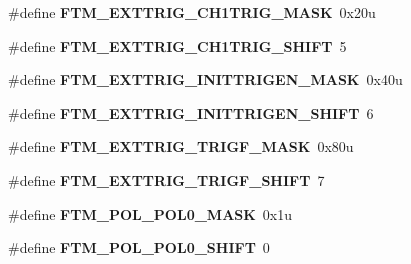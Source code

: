 \begin{DoxyCompactItemize}
\item 
\#define {\bfseries F\+T\+M\+\_\+\+E\+X\+T\+T\+R\+I\+G\+\_\+\+C\+H1\+T\+R\+I\+G\+\_\+\+M\+A\+SK}~0x20u\hypertarget{group__FTM__Register__Masks_ga5a26c6fcf0477c95760e13f68913b5de}{}\label{group__FTM__Register__Masks_ga5a26c6fcf0477c95760e13f68913b5de}

\item 
\#define {\bfseries F\+T\+M\+\_\+\+E\+X\+T\+T\+R\+I\+G\+\_\+\+C\+H1\+T\+R\+I\+G\+\_\+\+S\+H\+I\+FT}~5\hypertarget{group__FTM__Register__Masks_gab622ad237cfc1d00f20b317d23bff1ca}{}\label{group__FTM__Register__Masks_gab622ad237cfc1d00f20b317d23bff1ca}

\item 
\#define {\bfseries F\+T\+M\+\_\+\+E\+X\+T\+T\+R\+I\+G\+\_\+\+I\+N\+I\+T\+T\+R\+I\+G\+E\+N\+\_\+\+M\+A\+SK}~0x40u\hypertarget{group__FTM__Register__Masks_ga71d3ac60b3056f50c6d22c8e3b2701bb}{}\label{group__FTM__Register__Masks_ga71d3ac60b3056f50c6d22c8e3b2701bb}

\item 
\#define {\bfseries F\+T\+M\+\_\+\+E\+X\+T\+T\+R\+I\+G\+\_\+\+I\+N\+I\+T\+T\+R\+I\+G\+E\+N\+\_\+\+S\+H\+I\+FT}~6\hypertarget{group__FTM__Register__Masks_ga910785e872df234670a45cf1b00ad7c3}{}\label{group__FTM__Register__Masks_ga910785e872df234670a45cf1b00ad7c3}

\item 
\#define {\bfseries F\+T\+M\+\_\+\+E\+X\+T\+T\+R\+I\+G\+\_\+\+T\+R\+I\+G\+F\+\_\+\+M\+A\+SK}~0x80u\hypertarget{group__FTM__Register__Masks_gac6585f6c1888d29c05c5e8e3928d5a9e}{}\label{group__FTM__Register__Masks_gac6585f6c1888d29c05c5e8e3928d5a9e}

\item 
\#define {\bfseries F\+T\+M\+\_\+\+E\+X\+T\+T\+R\+I\+G\+\_\+\+T\+R\+I\+G\+F\+\_\+\+S\+H\+I\+FT}~7\hypertarget{group__FTM__Register__Masks_gae63a7bcedd63575b31712675d31475a2}{}\label{group__FTM__Register__Masks_gae63a7bcedd63575b31712675d31475a2}

\item 
\#define {\bfseries F\+T\+M\+\_\+\+P\+O\+L\+\_\+\+P\+O\+L0\+\_\+\+M\+A\+SK}~0x1u\hypertarget{group__FTM__Register__Masks_ga7ab70d13d9e83b5ae2beb7f5ba35dec3}{}\label{group__FTM__Register__Masks_ga7ab70d13d9e83b5ae2beb7f5ba35dec3}

\item 
\#define {\bfseries F\+T\+M\+\_\+\+P\+O\+L\+\_\+\+P\+O\+L0\+\_\+\+S\+H\+I\+FT}~0\hypertarget{group__FTM__Register__Masks_ga5cd0fca223b478bedc823f61829aadf9}{}\label{group__FTM__Register__Masks_ga5cd0fca223b478bedc823f61829aadf9}


\end{DoxyCompactItemize}
